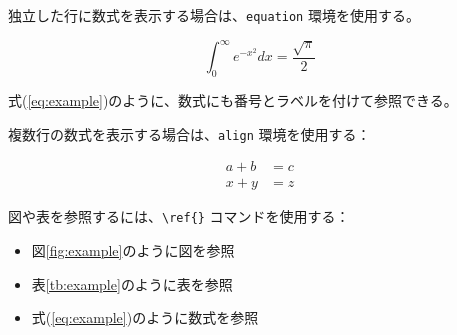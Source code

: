 独立した行に数式を表示する場合は、\verb|equation| 環境を使用する。

\begin{equation}\label{eq:example}
  \int_0^\infty e^{-x^2} dx = \frac{\sqrt{\pi}}{2}
\end{equation}

式(\ref{eq:example})のように、数式にも番号とラベルを付けて参照できる。


複数行の数式を表示する場合は、\verb|align| 環境を使用する：

\begin{align}
  a + b &= c \\
  x + y &= z
\end{align}


図や表を参照するには、\verb|\ref{}| コマンドを使用する：

\begin{itemize}
  \item 図\ref{fig:example}のように図を参照
  \item 表\ref{tb:example}のように表を参照
  \item 式(\ref{eq:example})のように数式を参照
\end{itemize}
\fi